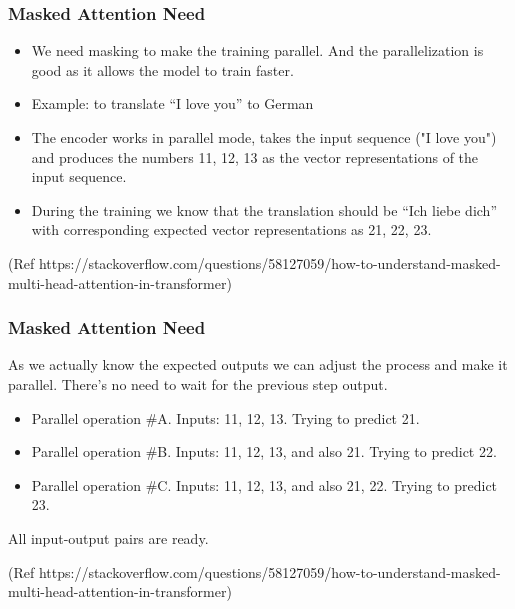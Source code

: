 \begin{frame}[fragile]\frametitle{Masked Attention Need}



\begin{itemize}
  \item  We need masking to make the training parallel. And the parallelization is good as it allows the model to train faster.
  \item  Example: to translate ``I love you'' to German
  \item The encoder works in parallel mode, takes the input sequence ("I love you")  and produces the numbers 11, 12, 13 as the vector representations of the input sequence.
  \item During the training we know that the translation should be ``Ich liebe dich'' with corresponding expected vector representations as 21, 22, 23.

\end{itemize}

{\tiny (Ref https://stackoverflow.com/questions/58127059/how-to-understand-masked-multi-head-attention-in-transformer)}

\end{frame}

\begin{frame}[fragile]\frametitle{Masked Attention Need}

As we actually know the expected outputs we can adjust the process and make it parallel. There's no need to wait for the previous step output.

\begin{itemize}
  \item  Parallel operation \#A. Inputs: 11, 12, 13. Trying to predict 21.
  \item Parallel operation \#B. Inputs: 11, 12, 13, and also 21. Trying to predict 22.
	\item Parallel operation \#C. Inputs: 11, 12, 13, and also 21, 22. Trying to predict 23.
\end{itemize}

All input-output pairs are ready.

{\tiny (Ref https://stackoverflow.com/questions/58127059/how-to-understand-masked-multi-head-attention-in-transformer)}

\end{frame}

